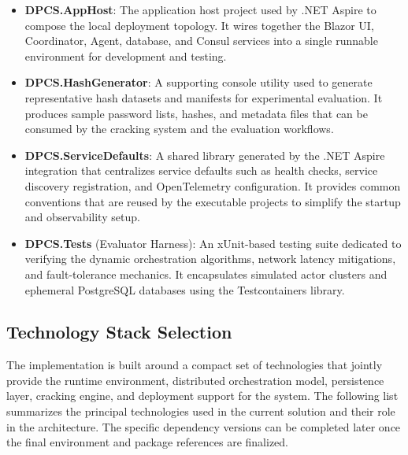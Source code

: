 \begin{itemize}
    \item \textbf{DPCS.AppHost}: The application host project used by .NET Aspire to compose the local deployment topology. It wires together the Blazor UI, Coordinator, Agent, database, and Consul services into a single runnable environment for development and testing.

    \item \textbf{DPCS.HashGenerator}: A supporting console utility used to generate representative hash datasets and manifests for experimental evaluation. It produces sample password lists, hashes, and metadata files that can be consumed by the cracking system and the evaluation workflows.

    \item \textbf{DPCS.ServiceDefaults}: A shared library generated by the .NET Aspire integration that centralizes service defaults such as health checks, service discovery registration, and OpenTelemetry configuration. It provides common conventions that are reused by the executable projects to simplify the startup and observability setup.

    \item \textbf{DPCS.Tests} (Evaluator Harness): An xUnit-based testing suite dedicated to verifying the dynamic orchestration algorithms, network latency mitigations, and fault-tolerance mechanics. It encapsulates simulated actor clusters and ephemeral PostgreSQL databases using the Testcontainers library.

\end{itemize}

\subsection{Technology Stack Selection}

The implementation is built around a compact set of technologies that jointly provide the runtime environment, distributed orchestration model, persistence layer, cracking engine, and deployment support for the system. The following list summarizes the principal technologies used in the current solution and their role in the architecture. The specific dependency versions can be completed later once the final environment and package references are finalized.

